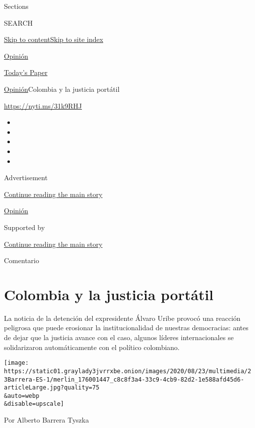 Sections

SEARCH

\protect\hyperlink{site-content}{Skip to
content}\protect\hyperlink{site-index}{Skip to site index}

\href{https://www.nytimes3xbfgragh.onion/es/section/opinion}{Opinión}

\href{https://myaccount.nytimes3xbfgragh.onion/auth/login?response_type=cookie\&client_id=vi}{}

\href{https://www.nytimes3xbfgragh.onion/section/todayspaper}{Today's
Paper}

\href{/es/section/opinion}{Opinión}\textbar{}Colombia y la justicia
portátil

\url{https://nyti.ms/31k9RHJ}

\begin{itemize}
\item
\item
\item
\item
\item
\end{itemize}

Advertisement

\protect\hyperlink{after-top}{Continue reading the main story}

\href{/es/section/opinion}{Opinión}

Supported by

\protect\hyperlink{after-sponsor}{Continue reading the main story}

Comentario

\hypertarget{colombia-y-la-justicia-portuxe1til}{%
\section{Colombia y la justicia
portátil}\label{colombia-y-la-justicia-portuxe1til}}

La noticia de la detención del expresidente Álvaro Uribe provocó una
reacción peligrosa que puede erosionar la institucionalidad de nuestras
democracias: antes de dejar que la justicia avance con el caso, algunos
líderes internacionales se solidarizaron automáticamente con el político
colombiano.

\texttt{[image: https://static01.graylady3jvrrxbe.onion/images/2020/08/23/multimedia/23Barrera-ES-1/merlin\_176001447\_c8c8f3a4-33c9-4cb9-82d2-1e588afd45d6-articleLarge.jpg?quality=75\\\&auto=webp\\\&disable=upscale]}

Por Alberto Barrera Tyszka

